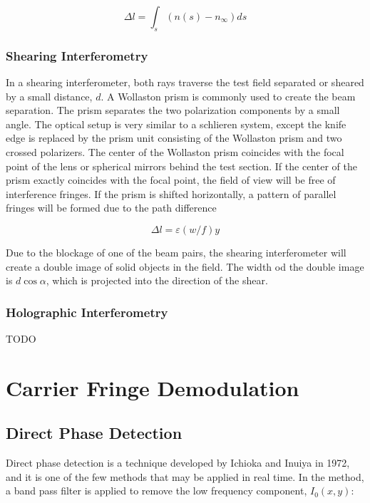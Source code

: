 \documentclass[11pt]{article} %
\begin{document}
\begin{equation}
	\Delta l = \int_{s} \left ( n(s) - n_\infty \right )ds
	\label{eq:reference_int}
\end{equation}

\subsubsection{Shearing Interferometry}

In a shearing interferometer, both rays traverse the test field separated or sheared by a small distance, $d$.  A Wollaston prism is commonly used to create the beam separation. The prism separates the two polarization components by a small angle. The optical setup is very similar to a schlieren system, except the knife edge is replaced by the prism unit consisting of the Wollaston prism and two crossed polarizers. The center of the Wollaston prism coincides with the focal point of the lens or spherical mirrors behind the test section.
If the center of the prism exactly coincides with the focal point, the field of view will be free of interference fringes. If the prism is shifted horizontally, a pattern of parallel fringes will be formed due to the path difference

\begin{equation}
	\Delta l = \varepsilon (w / f) y
	\label{eq:shear_vert}
\end{equation}

Due to the blockage of one of the beam pairs, the shearing interferometer will create a double image of solid objects in the field. The width od the double image is $d \cos \alpha$, which is projected into the direction of the shear.

\subsubsection{Holographic Interferometry}
TODO


\section{Carrier Fringe Demodulation}

\subsection{Direct Phase Detection}
Direct phase detection is a technique developed by Ichioka and Inuiya in 1972, and it is one of the few methods that may be applied in real time. In the method, a band pass filter is applied to remove the low frequency component, $I_0(x,y)$:
\end{document}
